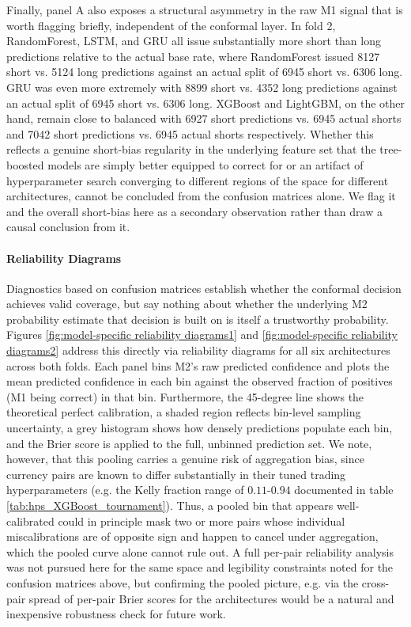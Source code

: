 \documentclass[12pt, a4paper]{article}
\begin{document}
\medskip

Finally, panel A also exposes a structural asymmetry in the raw M1 signal that is worth flagging briefly, independent of the conformal layer. In fold 2, RandomForest, LSTM, and 
GRU all issue substantially more short than long predictions relative to the actual base rate, where RandomForest issued 8127 short vs. 5124 long predictions against an 
actual split of 6945 short vs. 6306 long. GRU was even more extremely with 8899 short vs. 4352 long predictions against an actual split of 6945 short vs. 6306 long. 
XGBoost and LightGBM, on the other hand, remain close to balanced with 6927 short predictions vs. 6945 actual shorts and 7042 short predictions vs. 6945 actual shorts respectively. 
Whether this reflects a genuine short-bias regularity in the underlying feature set that the tree-boosted models are simply better equipped to correct for or an artifact of 
hyperparameter search converging to different regions of the space for different architectures, cannot be concluded from the confusion matrices alone. We flag it and the overall 
short-bias here as a secondary observation rather than draw a causal conclusion from it.


\paragraph{Reliability Diagrams}\hspace{0pt}

Diagnostics based on confusion matrices establish whether the conformal decision achieves valid coverage, but say nothing about whether the underlying M2 probability estimate 
that decision is built on is itself a trustworthy probability. Figures \ref{fig:model-specific reliability diagrams1} and \ref{fig:model-specific reliability diagrams2} address 
this directly via reliability diagrams for all six architectures across both folds. Each panel bins M2's raw predicted confidence and plots the mean predicted confidence in each bin 
against the observed fraction of positives (M1 being correct) in that bin. Furthermore, the 45-degree line shows the theoretical perfect calibration, a shaded region reflects bin-level 
sampling uncertainty, a grey histogram shows how densely predictions populate each bin, and the Brier score is applied to the full, unbinned prediction set.
We note, however, that this pooling carries a genuine risk of aggregation bias, since currency pairs are known to differ substantially in their tuned trading hyperparameters 
(e.g. the Kelly fraction range of $0.11$-$0.94$ documented in table \ref{tab:hps_XGBoost_tournament}). Thus, a pooled bin that appears well-calibrated could in principle mask two or 
more pairs whose individual miscalibrations are of opposite sign and happen to cancel under aggregation, which the pooled curve alone cannot 
rule out. A full per-pair reliability analysis was not pursued here for the same space and legibility constraints noted for the confusion matrices above, but confirming the 
pooled picture, e.g. via the cross-pair spread of per-pair Brier scores for the architectures would be a natural and inexpensive robustness check for future work.
\end{document}
